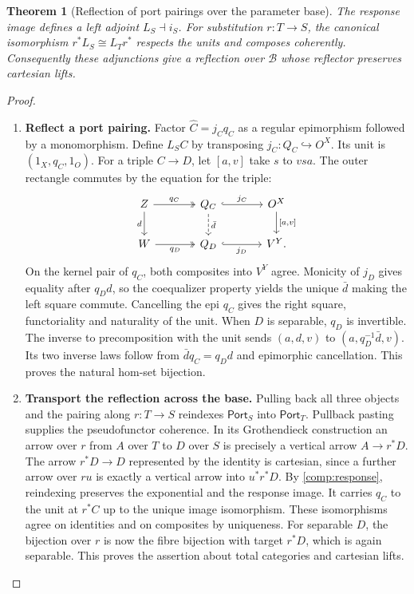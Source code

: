 \documentclass[11pt,a4paper]{article}
\newtheorem{theorem}{Theorem}[section]
\theoremstyle{definition}
\theoremstyle{remark}\newaliascnt{remark}{theorem}
\numberwithin{equation}{section}
\begin{document}
\begin{theorem}[Reflection of port pairings over the parameter base]\label{thm:fibred-reflection}
The response image defines a left adjoint \(L_S\dashv i_S\). For substitution \(r:T\to S\), the canonical isomorphism \(r^*L_S\cong L_T r^*\) respects the units and composes coherently. Consequently these adjunctions give a reflection over \(\mathcal B\) whose reflector preserves cartesian lifts.
\end{theorem}
\begin{proof}\leavevmode
\begin{enumerate}[titledsteps]
    \item \textbf{Reflect a port pairing.} Factor \(\widehat C=j_Cq_C\) as a regular epimorphism followed by a monomorphism. Define \(L_SC\) by transposing \(j_C:Q_C\hookrightarrow O^X\). Its unit is \((1_X,q_C,1_O)\). For a triple \(C\to D\), let \([a,v]\) take \(s\) to \(vsa\). The outer rectangle commutes by the equation for the triple:
\[
\begin{tikzcd}[column sep=large]
 Z\arrow[r,two heads,"q_C"]\arrow[d,"d"']&Q_C\arrow[r,hook,"j_C"]\arrow[d,dashed,"\bar d"]&O^X\arrow[d,"{[a,v]}"]\\
 W\arrow[r,two heads,"q_D"']&Q_D\arrow[r,hook,"j_D"']&V^Y .
\end{tikzcd}
\]
On the kernel pair of \(q_C\), both composites into \(V^Y\) agree. Monicity of \(j_D\) gives equality after \(q_Dd\), so the coequalizer property yields the unique \(\bar d\) making the left square commute. Cancelling the epi \(q_C\) gives the right square, functoriality and naturality of the unit. When \(D\) is separable, \(q_D\) is invertible. The inverse to precomposition with the unit sends \((a,d,v)\) to \((a,q_D^{-1}\bar d,v)\). Its two inverse laws follow from \(\bar d q_C=q_D d\) and epimorphic cancellation. This proves the natural hom-set bijection.


    \item \textbf{Transport the reflection across the base.} Pulling back all three objects and the pairing along \(r:T\to S\) reindexes \(\mathsf{Port}_S\) into \(\mathsf{Port}_T\). Pullback pasting supplies the pseudofunctor coherence. In its Grothendieck construction an arrow over \(r\) from \(A\) over \(T\) to \(D\) over \(S\) is precisely a vertical arrow \(A\to r^*D\). The arrow \(r^*D\to D\) represented by the identity is cartesian, since a further arrow over \(ru\) is exactly a vertical arrow into \(u^*r^*D\). By \cref{comp:response}, reindexing preserves the exponential and the response image. It carries \(q_C\) to the unit at \(r^*C\) up to the unique image isomorphism. These isomorphisms agree on identities and on composites by uniqueness. For separable \(D\), the bijection over \(r\) is now the fibre bijection with target \(r^*D\), which is again separable. This proves the assertion about total categories and cartesian lifts.\qedhere
\end{enumerate}
\end{proof}
\end{document}
